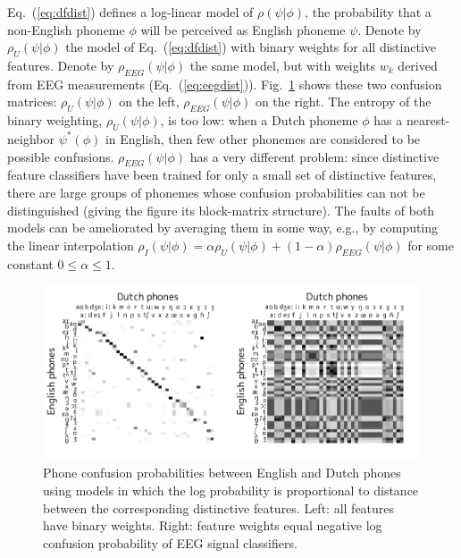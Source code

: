 Eq.~(\ref{eq:dfdist}) defines a log-linear model of $\rho(\psi|\phi)$,
the probability that a non-English phoneme $\phi$ will be perceived as
English phoneme $\psi$.  Denote by $\rho_U(\psi|\phi)$ the model of
Eq.~(\ref{eq:dfdist}) with binary weights for all distinctive
features. Denote by
$\rho_{EEG}(\psi|\phi)$ the same model, but with weights $w_k$ derived
from EEG measurements (Eq.~(\ref{eq:eegdist})).
Fig.~\ref{fig:eeg_confusions} shows these two confusion matrices:
$\rho_U(\psi|\phi)$ on the left, $\rho_{EEG}(\psi|\phi)$ on the
right. The entropy of the binary weighting, $\rho_U(\psi|\phi)$, is
too low: when a Dutch phoneme $\phi$ has a nearest-neighbor
$\psi^*(\phi)$ in English, then few other phonemes are considered to
be possible confusions.  $\rho_{EEG}(\psi|\phi)$ has a very different
problem: since distinctive feature classifiers have been trained for
only a small set of distinctive features, there are large groups of
phonemes whose confusion probabilities can not be distinguished
(giving the figure its block-matrix structure).  The faults of both
models can be ameliorated by averaging them in some way, e.g., by
computing the linear interpolation
$\rho_I(\psi|\phi)=\alpha\rho_U(\psi|\phi)+(1-\alpha)\rho_{EEG}(\psi|\phi)$ for
some constant $0\le\alpha\le 1$.

\begin{figure}
  \centerline{
    \includegraphics[width=\columnwidth]{../figs/confusion-matrix/confusion-matrices.pdf}
  }
    \vspace*{-0.3cm}
  \caption{Phone confusion probabilities between English and Dutch
    phones using models in which the log
    probability is proportional to distance between the corresponding
    distinctive features.  Left: all features have binary
    weights.  Right: feature weights equal negative log confusion
    probability of EEG signal classifiers.}
  \label{fig:eeg_confusions}
\end{figure}

